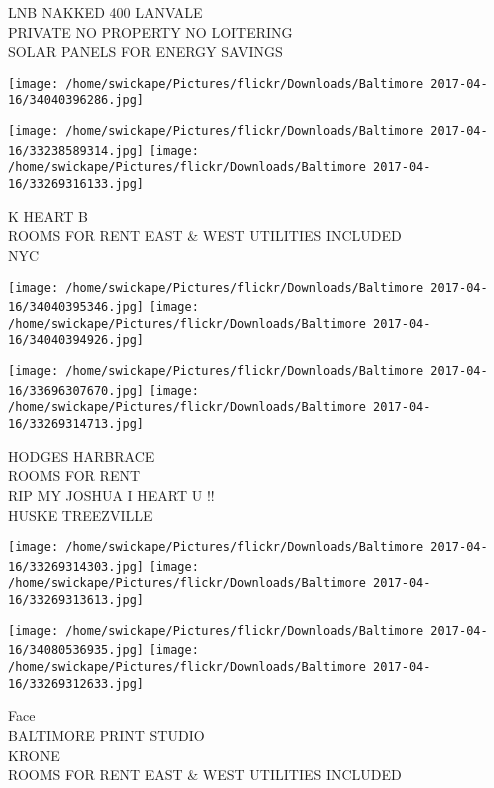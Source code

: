 \documentclass[10pt,letterpaper]{article}
\begin{document}
LNB NAKKED 400 LANVALE\\
PRIVATE NO PROPERTY NO LOITERING\\
SOLAR PANELS FOR ENERGY SAVINGS\\
\pagebreak

\texttt{[image: /home/swickape/Pictures/flickr/Downloads/Baltimore 2017-04-16/34040396286.jpg]}

\vspace{0.25in}
\texttt{[image: /home/swickape/Pictures/flickr/Downloads/Baltimore 2017-04-16/33238589314.jpg]}
\texttt{[image: /home/swickape/Pictures/flickr/Downloads/Baltimore 2017-04-16/33269316133.jpg]}

K HEART B\\
ROOMS FOR RENT EAST \& WEST UTILITIES INCLUDED\\
NYC\\
\pagebreak

\texttt{[image: /home/swickape/Pictures/flickr/Downloads/Baltimore 2017-04-16/34040395346.jpg]}
\texttt{[image: /home/swickape/Pictures/flickr/Downloads/Baltimore 2017-04-16/34040394926.jpg]}

\texttt{[image: /home/swickape/Pictures/flickr/Downloads/Baltimore 2017-04-16/33696307670.jpg]}
\texttt{[image: /home/swickape/Pictures/flickr/Downloads/Baltimore 2017-04-16/33269314713.jpg]}

HODGES HARBRACE\\
ROOMS FOR RENT\\
RIP MY JOSHUA I HEART U !!\\
HUSKE TREEZVILLE\\
\pagebreak

\texttt{[image: /home/swickape/Pictures/flickr/Downloads/Baltimore 2017-04-16/33269314303.jpg]}
\texttt{[image: /home/swickape/Pictures/flickr/Downloads/Baltimore 2017-04-16/33269313613.jpg]}

\texttt{[image: /home/swickape/Pictures/flickr/Downloads/Baltimore 2017-04-16/34080536935.jpg]}
\texttt{[image: /home/swickape/Pictures/flickr/Downloads/Baltimore 2017-04-16/33269312633.jpg]}

Face\\
BALTIMORE PRINT STUDIO\\
KRONE\\
ROOMS FOR RENT EAST \& WEST UTILITIES INCLUDED\\
\pagebreak
\end{document}
